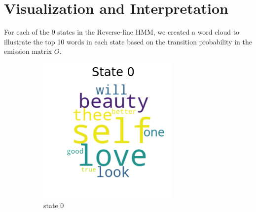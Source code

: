 \section{Visualization and Interpretation}

For each of the 9 states in the Reverse-line HMM, we created a word cloud to illustrate the top 10 words in each state based on the transition probability in the emission matrix $O$.

\begin{figure}[H]
	\centering
	\begin{subfigure}[t]{0.3\textwidth}
		\includegraphics[width=\textwidth]{download(0).png}
		\caption{state 0}
	\end{subfigure}%
	\begin{subfigure}[t]{0.3\textwidth}

\end{subfigure}
\end{figure}
